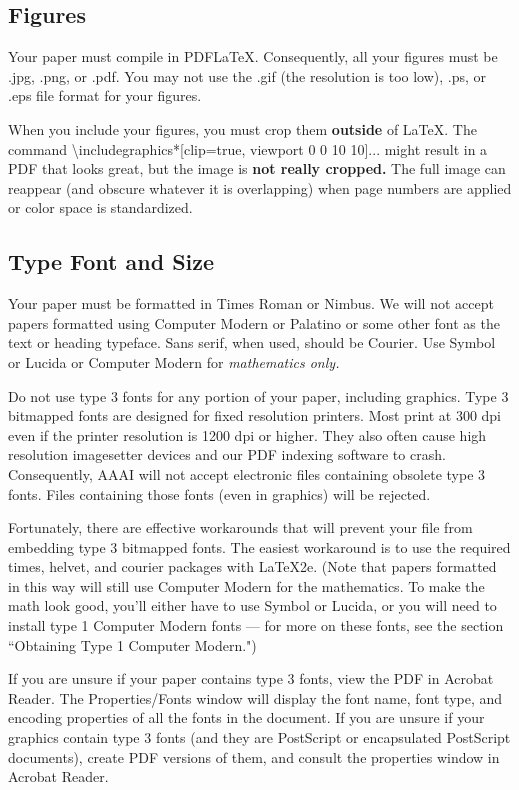 \documentclass[letterpaper]{article}
\begin{document}
\subsection{Figures}
Your paper must compile in PDF\LaTeX{}. Consequently, all your figures must be .jpg, .png, or .pdf. You may not use  the .gif (the resolution is too low), .ps, or .eps file format for your figures.

When you include your figures, you must crop them \textbf{outside} of \LaTeX{}. The command \textbackslash includegraphics*[clip=true, viewport 0 0 10 10]{...} might result in a PDF that looks great, but the image is \textbf{not really cropped.} The full image can reappear (and obscure whatever it is overlapping) when page numbers are applied or color space is standardized. 

\subsection{Type Font and Size}
Your paper must be formatted in Times Roman or Nimbus. We will not accept papers formatted using Computer Modern or Palatino or some other font as the text or heading typeface. Sans serif, when used, should be Courier. Use Symbol or Lucida or Computer Modern for \textit{mathematics only. } 

Do not use type 3 fonts for any portion of your paper, including graphics. Type 3 bitmapped fonts are designed for fixed resolution printers. Most print at 300 dpi even if the printer resolution is 1200 dpi or higher. They also often cause high resolution imagesetter devices and our PDF indexing software to crash. Consequently, AAAI will not accept electronic files containing obsolete type 3 fonts. Files containing those fonts (even in graphics) will be rejected. 

Fortunately, there are effective workarounds that will prevent your file from embedding type 3 bitmapped fonts. The easiest workaround is to use the required times, helvet, and courier packages with \LaTeX{}2e. (Note that papers formatted in this way will still use Computer Modern for the mathematics. To make the math look good, you'll either have to use Symbol or Lucida, or you will need to install type 1 Computer Modern fonts --- for more on these fonts, see the section ``Obtaining Type 1 Computer Modern.")

If you are unsure if your paper contains type 3 fonts, view the PDF in Acrobat Reader. The Properties/Fonts window will display the font name, font type, and encoding properties of all the fonts in the document. If you are unsure if your graphics contain type 3 fonts (and they are PostScript or encapsulated PostScript documents), create PDF versions of them, and consult the properties window in Acrobat Reader. 
\end{document}
